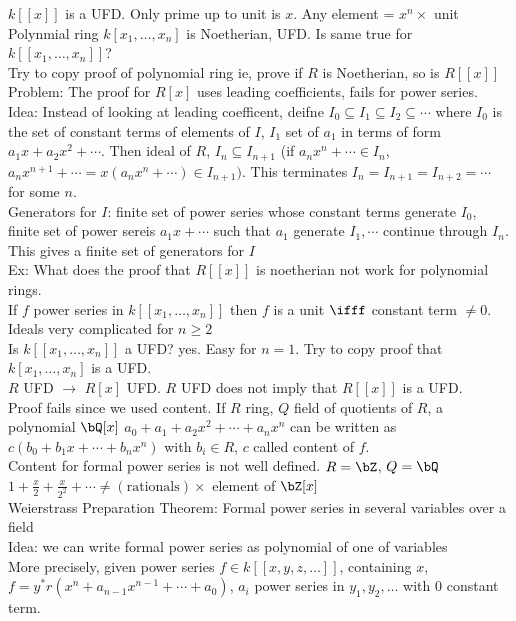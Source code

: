 \noindent
$k[[x]]$ is a UFD. Only prime up to unit is $x$. Any element = $x^n \times$ unit \\
Polynmial ring $k[x_1, \ldots, x_n]$ is Noetherian, UFD. Is same true for $k[[x_1, \ldots, x_n]]$? \\ 
Try to copy proof of polynomial ring ie, prove if $R$ is Noetherian, so is $R[[x]]$ \\
Problem: The proof for $R[x]$ uses leading coefficients, fails for power series. \\
Idea: Instead of looking at leading coefficent, deifne $I_0 \subseteq I_1 \subseteq I_2 \subseteq \cdots$ where $I_0$ is the set of constant terms of elements of $I$, $I_1$ set of $a_1$ in terms of form $a_1x + a_2x^2 + \cdots$. Then ideal of $R$, $I_n \subseteq I_{n+1}$ (if $a_nx^n + \cdots \in I_n$, $a_nx^{n+1} + \cdots = x(a_nx^n + \cdots) \in I_{n+1})$. This terminates $I_n = I_{n+1} = I_{n+2} = \cdots$ for some $n$. \\
Generators for $I$: finite set of power series whose constant terms generate $I_0$, finite set of power sereis $a_1x + \cdots$ such that $a_1$ generate $I_1, \cdots$ continue through $I_n$. This gives a finite set of generators for $I$ \\
Ex: What does the proof that $R[[x]]$ is noetherian not work for polynomial rings. \\

\noindent
If $f$ power series in $k[[x_1, \ldots, x_n]]$ then $f$ is a unit $\ifff$ constant term $\neq 0$. Ideals very complicated for $n \ge 2$ \\
Is $k[[x_1, \ldots, x_n]]$ a UFD? yes. Easy for $n=1$. Try to copy proof that $k[x_1, \ldots, x_n]$ is a UFD. \\
$R$ UFD $\to$ $R[x]$ UFD. $R$ UFD does not imply that $R[[x]]$ is a UFD. \\ 
Proof fails since we used content. If $R$ ring, $Q$ field of quotients of $R$, a polynomial $\bQ[x]$ $a_0 + a_1 + a_2x^2 + \cdots + a_nx^n$ can be written as $c(b_0 + b_1 x + \cdots + b_nx^n)$ with $b_i \in R$, $c$ called content of $f$. \\
Content for formal power series is not well defined. $R = \bZ$, $Q = \bQ$ $1 + \frac{x}{2} + \frac{x}{2^2}  +\cdots \neq (\text{rationals}) \times$ element of $\bZ[x]$ \\

\noindent
Weierstrass Preparation Theorem: Formal power series in several variables over a field \\ 
Idea: we can write formal power series as polynomial of one of variables \\ 
More precisely, given power series $f \in k[[x, y, z, \ldots]]$, containing $x$, $f = y^* r(x^n + a_{n-1}x^{n-1} + \cdots + a_0)$, $a_i$ power series in $y_1, y_2, \ldots$ with 0 constant term. 

